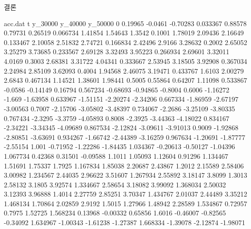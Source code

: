 \documentclass[Junlampaper, portrait]{Junlam_PosterK}
\begin{document}
\begin{poster}
\begin{posterbox}[name=result,column=3,]{결론  }
\begin{filecontents}{acc.dat}
                t	y_30000	y_40000	y_50000
                0	0.19965	-0.0461	-0.70283
                0.033367	0.88578	0.79731	0.26519
                0.066734	1.41854	1.54643	1.3542
                0.1001	1.78019	2.09436	2.16649
                0.133467	2.10058	2.51832	2.74721
                0.166834	2.42496	2.9166	3.28632
                0.2002	2.65052	3.25279	3.73685
                0.233567	2.69128	3.32493	3.95223
                0.266934	2.69601	3.32011	4.0169
                0.3003	2.68381	3.31722	4.04341
                0.333667	2.53945	3.18505	3.92908
                0.367034	2.24984	2.85109	3.62093
                0.4004	1.94568	2.46075	3.19471
                0.433767	1.6103	2.00279	2.6843
                0.467134	1.14521	1.38601	1.98441
                0.5005	0.55864	0.64207	1.11098
                0.533867	-0.0586	-0.14149	0.16794
                0.567234	-0.68693	-0.94865	-0.8004
                0.6006	-1.16272	-1.669	-1.63958
                0.633967	-1.51151	-2.20274	-2.34206
                0.667334	-1.86959	-2.67197	-3.00563
                0.7007	-2.15706	-3.05802	-3.48397
                0.734067	-2.2686	-3.25109	-3.80335
                0.767434	-2.3295	-3.3759	-4.05893
                0.8008	-2.3925	-3.44363	-4.18022
                0.834167	-2.34221	-3.34345	-4.09689
                0.867534	-2.12824	-3.09611	-3.91013
                0.9009	-1.92868	-2.80851	-3.63691
                0.934267	-1.66742	-2.44389	-3.16259
                0.967634	-1.20691	-1.87777	-2.55154
                1.001	-0.71952	-1.22286	-1.84435
                1.034367	-0.20613	-0.50127	-1.04396
                1.067734	0.42368	0.31501	-0.09588
                1.1011	1.05093	1.12604	0.91296
                1.134467	1.51691	1.75337	1.7925
                1.167834	1.85038	2.20687	2.43867
                1.2012	2.15589	2.58406	3.00982
                1.234567	2.44035	2.96622	3.51607
                1.267934	2.55892	3.18147	3.8099
                1.3013	2.58132	3.1805	3.92574
                1.334667	2.58654	3.18082	3.99092
                1.368034	2.50032	3.12393	3.96888
                1.4014	2.27759	2.85251	3.70347
                1.434767	2.01037	2.44489	3.35212
                1.468134	1.70864	2.02859	2.9192
                1.5015	1.27966	1.48942	2.28589
                1.534867	0.72957	0.7975	1.52725
                1.568234	0.13968	-0.00332	0.65856
                1.6016	-0.46007	-0.82565	-0.34092
                1.634967	-1.00343	-1.61238	-1.27387
                1.668334	-1.39078	-2.12874	-1.98071

\end{filecontents}
\end{posterbox}
\end{poster}
\end{document}
